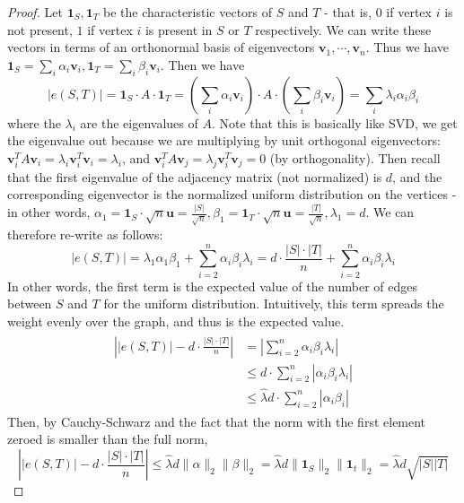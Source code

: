 \documentclass[11pt]{article}
\theoremstyle{definition}
\theoremstyle{definition}
\theoremstyle{definition}
\begin{document}
\begin{proof}
Let $\textbf{1}_S, \textbf{1}_T$ be the characteristic vectors of $S$ and $T$ - that is, $0$ if vertex $i$ is not present, $1$ if vertex $i$ is present in $S$ or $T$ respectively. We can write these vectors in terms of an orthonormal basis of eigenvectors $\textbf{v}_1,\cdots, \textbf{v}_n$. Thus we have $\textbf{1}_S = \sum_i \alpha_i \textbf{v}_i, \textbf{1}_T = \sum_i \beta_i \textbf{v}_i$. Then we have 
\[
|e(S, T)| = \textbf{1}_S \cdot A \cdot \textbf{1}_T = \left(\sum_i \alpha_i \textbf{v}_i\right) \cdot A \cdot \left(\sum_i \beta_i \textbf{v}_i\right) = \sum_i \lambda_i \alpha_i \beta_i
\]
where the $\lambda_i$ are the eigenvalues of $A$. Note that this is basically like SVD, we get the eigenvalue out because we are multiplying by unit orthogonal eigenvectors: $\textbf{v}_i^TA\textbf{v}_i = \lambda_i\textbf{v}_i^T\textbf{v}_i = \lambda_i$, and $\textbf{v}_i^TA\textbf{v}_j = \lambda_j \textbf{v}_i^T\textbf{v}_j = 0$ (by orthogonality). 
Then recall that the first eigenvalue of the adjacency matrix (not normalized) is $d$, and the corresponding eigenvector is the normalized uniform distribution on the vertices - in other words, $\alpha_1 = \textbf{1}_S \cdot \sqrt{n}\textbf{u} = \frac{|S|}{\sqrt{n}}, \beta_1 = \textbf{1}_T \cdot \sqrt{n}\textbf{u} = \frac{|T|}{\sqrt{n}}, \lambda_1 = d$. We can therefore re-write as follows: 
\[
|e(S, T)| = \lambda_1\alpha_1\beta_1 + \sum_{i = 2}^n \alpha_i\beta_i\lambda_i = d \cdot \frac{|S| \cdot |T|}{n} + \sum_{i = 2}^n \alpha_i\beta_i\lambda_i
\]
In other words, the first term is the expected value of the number of edges between $S$ and $T$ for the uniform distribution. Intuitively, this term spreads the weight evenly over the graph, and thus is the expected value.
\begin{align}
\begin{split}
\left||e(S, T)| -  d \cdot \frac{|S| \cdot |T|}{n}\right| &= \left|\sum_{i = 2}^n \alpha_i\beta_i\lambda_i \right| 
\\
&\leq d \cdot \sum_{i = 2}^n \left| \alpha_i\beta_i\lambda_i \right|
\\
&\leq \hat{\lambda}d \cdot \sum_{i = 2}^n \left| \alpha_i\beta_i\right|
\end{split}
\end{align}
Then, by Cauchy-Schwarz and the fact that the norm with the first element zeroed is smaller than the full norm,
\[
\left||e(S, T)| -  d \cdot \frac{|S| \cdot |T|}{n}\right| \leq \hat{\lambda}d\|\alpha\|_2\|\beta\|_2 = \hat{\lambda}d\|\textbf{1}_S\|_2\|\textbf{1}_t\|_2 = \hat{\lambda}d\sqrt{|S||T|}
\]
\end{proof}
\end{document}
